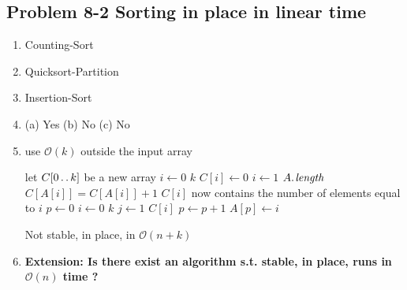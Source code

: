 \subsection*{Problem 8-2 Sorting in place in linear time}
\begin{enumerate}
	\item	Counting-Sort
	\item	Quicksort-Partition
	\item	Insertion-Sort
	\item	(a) Yes (b) No (c) No
	\item	use $\mathcal{O}(k)$ outside the input array
		\begin{codebox}
		\li	\Comment let $C[0 \mathinner{\ldotp\ldotp} k]$ be a new array
		\li	\For $i \gets 0$ \To $k$
			\Do
		\li		$C[i] \gets 0$
			\End
		\li	\For $i \gets 1$ \To $\attrib{A}{length}$
			\Do
		\li		$C[A[i]] = C[A[i]] + 1$	
			\End
		\li	\Comment $C[i]$ now contains the number of elements equal to $i$
		\li	$p \gets 0$
		\li	\For $i \gets 0$ \To $k$
			\Do
		\li		\For $j \gets 1$ \To $C[i]$
				\Do
		\li			$p \gets p + 1$
		\li			$A[p] \gets i$
				\End
			\End
		\end{codebox}
		Not stable, in place, in $\mathcal{O}(n + k)$
	\item	\bfseries{Extension: Is there exist an algorithm s.t. stable, in place, runs in $\mathcal{O}(n)$ time ?}
\end{enumerate}

